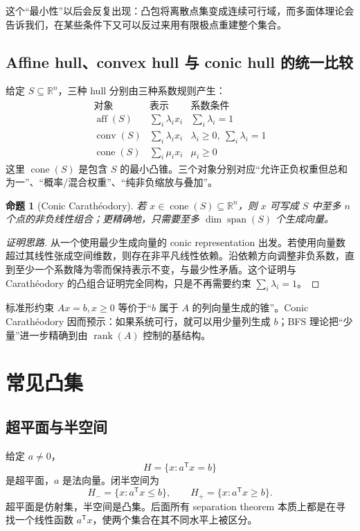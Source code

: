\documentclass[11pt,a4paper,openany]{ctexrep}
\newtheorem{proposition}[theorem]{命题}
\theoremstyle{definition}
\newcommand{\R}{\mathbb{R}}
\newcommand{\aff}{\operatorname{aff}}
\newcommand{\conv}{\operatorname{conv}}
\newcommand{\cone}{\operatorname{cone}}
\newcommand{\rank}{\operatorname{rank}}
\newcommand{\spanop}{\operatorname{span}}
\newcommand{\transpose}{\mathsf{T}}
\begin{document}
这个“最小性”以后会反复出现：凸包将离散点集变成连续可行域，而多面体理论会告诉我们，在某些条件下又可以反过来用有限极点重建整个集合。


\subsection{Affine hull、convex hull 与 conic hull 的统一比较}
给定 $S\subseteq\R^n$，三种 hull 分别由三种系数规则产生：
\[
\begin{array}{c|c|c}
\text{对象} & \text{表示} & \text{系数条件}\\ \hline
\aff(S) & \sum_i \lambda_i x_i & \sum_i\lambda_i=1\\
\conv(S) & \sum_i \lambda_i x_i & \lambda_i\ge0,\ \sum_i\lambda_i=1\\
\cone(S) & \sum_i \mu_i x_i & \mu_i\ge0
\end{array}
\]
这里 $\cone(S)$ 是包含 $S$ 的最小凸锥。三个对象分别对应“允许正负权重但总和为一”、“概率/混合权重”、“纯非负缩放与叠加”。

\begin{proposition}[Conic Carath\'eodory]
若 $x\in\cone(S)\subseteq\R^n$，则 $x$ 可写成 $S$ 中至多 $n$ 个点的非负线性组合；更精确地，只需要至多 $\dim\spanop(S)$ 个生成向量。
\end{proposition}
\begin{proof}[证明思路]
从一个使用最少生成向量的 conic representation 出发。若使用向量数超过其线性张成空间维数，则存在非平凡线性依赖。沿依赖方向调整非负系数，直到至少一个系数降为零而保持表示不变，与最少性矛盾。这个证明与 Carath\'eodory 的凸组合证明完全同构，只是不再需要约束 $\sum_i\lambda_i=1$。
\end{proof}

\begin{keybox}
标准形约束 $Ax=b,x\ge0$ 等价于“$b$ 属于 $A$ 的列向量生成的锥”。Conic Carath\'eodory 因而预示：如果系统可行，就可以用少量列生成 $b$；BFS 理论把“少量”进一步精确到由 $\rank(A)$ 控制的基结构。
\end{keybox}

\section{常见凸集}

\subsection{超平面与半空间}
给定 $a\ne0$，
\[
H=\{x:a^\transpose x=b\}
\]
是超平面，$a$ 是法向量。闭半空间为
\[
H_- = \{x:a^\transpose x\le b\},\qquad
H_+ = \{x:a^\transpose x\ge b\}.
\]
超平面是仿射集，半空间是凸集。后面所有 separation theorem 本质上都是在寻找一个线性函数 $a^\transpose x$，使两个集合在其不同水平上被区分。
\end{document}
